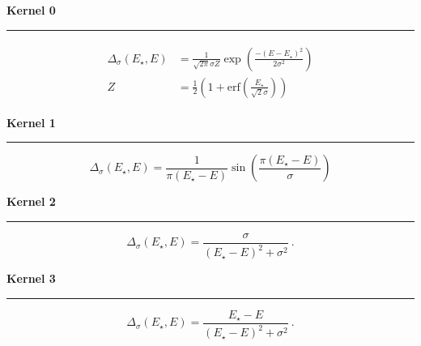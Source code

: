 \documentclass[12pt]{article}
\begin{document}
\centering

{\large\bf Kernel 0}\\
\rule{0.75\textwidth}{1pt}
\begin{align}
\begin{split}
 \Delta_\sigma(E_\star,E) &= \frac{1}{\sqrt{2\pi}\sigma Z}\exp\left(\frac{-(E-E_\star)^2}{2\sigma^2}\right) \\[5mm]
 Z &= \frac{1}{2}\left(1+\mathrm{erf}\left(\frac{E_\star}{\sqrt{2}\sigma}\right)\right)
\end{split} 
\end{align}

\vskip  15mm
{\large\bf Kernel 1}\\
\rule{0.75\textwidth}{1pt}
\begin{equation}
 \Delta_\sigma(E_\star,E) = \frac{1}{\pi(E_\star-E)}\sin\left(\frac{\pi(E_\star-E)}{\sigma}\right)
\end{equation}

\vskip  15mm
{\large\bf Kernel 2}\\
\rule{0.75\textwidth}{1pt}
\begin{equation}
 \Delta_\sigma(E_\star,E) = \frac{\sigma}{(E_\star-E)^2+\sigma^2}~.
\end{equation}

\vskip  15mm
{\large\bf Kernel 3}\\
\rule{0.75\textwidth}{1pt}
\begin{equation}
 \Delta_\sigma(E_\star,E) = \frac{E_\star-E}{(E_\star-E)^2+\sigma^2}~.
\end{equation}

\pagestyle{empty}
\end{document}
